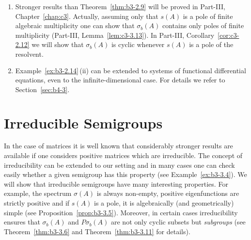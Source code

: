 \begin{remarks}
\begin{enumerate}[\upshape (i), wide, labelindent=.25em]
	\item 
	Stronger results than Theorem~\ref{thm:b3-2.9} will be proved in Part-III, Chapter~\ref{chap:c3}.
	Actually, assuming only that $s(A)$ is a pole of finite algebraic multiplicity one can show that $\sigma_{b}(A)$ contains only poles of finite multiplicity (Part-III, Lemma~\ref{lem:c3-3.13}).
	In Part-III, Corollary~\ref{cor:c3-2.12} we will show that $\sigma_{b}(A)$ is cyclic whenever $s(A)$ is a pole of the resolvent.
	
	\item 
	Example~\ref{ex:b3-2.14}\,(ii) can be extended to systems of functional differential equations, even to the infinite-dimensional case.
	For details we refer to Section~\ref{sec:b4-3}.
\end{enumerate}	
\end{remarks}

\section{Irreducible Semigroups}\label{sec:b3-3}%
In the case of matrices it is well known that considerably stronger results are available if one considers positive matrices which are irreducible. 
The concept of irreducibility can be extended to our setting and in many cases one can check easily whether a given semigroup has this property (see Example~\ref{ex:b3-3.4}). 
We will show that irreducible semigroups have many interesting properties. 
For example, the spectrum $\sigma(A)$ is always non-empty, positive eigenfunctions are strictly positive and if\/ $s(A)$ is a pole, it is algebraically (and geometri­cally) simple (see Proposition~\ref{prop:b3-3.5}). 
Moreover, in certain cases irreducibility ensures that $\sigma_{b}(A)$ and $P\sigma_{b}(A)$ are not only cyclic subsets but \emph{subgroups} (see Theorem~\ref{thm:b3-3.6} and Theorem~\ref{thm:b3-3.11} for details). 

